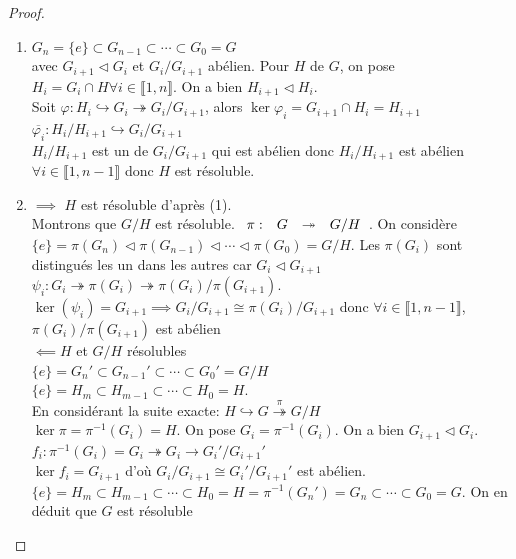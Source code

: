 \documentclass[]{report}
\begin{document}
    \begin{proof}
        \begin{enumerate}
            \item $G_n=\{e\}\subset G_{n-1}\subset \cdots\subset G_0=G$\\
            avec $G_{i+1}\triangleleft G_i$ et $G_i/G_{i+1}$ abélien. Pour $H$ \sg de $G$, on pose $H_i=G_i\cap H\forall i\in \llbracket 1,n\rrbracket$. On a bien $H_{i+1}\triangleleft H_i$.\\
            Soit $\varphi: H_i\hookrightarrow G_i\twoheadrightarrow G_i/G_{i+1}$, alors $\ker \varphi_i=G_{i+1}\cap H_i=H_{i+1}$\\
            $\overline{\varphi_i}: H_i/H_{i+1}\hookrightarrow G_i/G_{i+1}$\\
            $H_i/H_{i+1}$ est un \sg de $G_i/G_{i+1}$ qui est abélien donc $H_i/H_{i+1}$ est abélien $\forall i\in \llbracket 1,n-1\rrbracket$ donc $H$ est résoluble.
            \item $\implies$ $H$ est résoluble d'après (1).\\
            Montrons que $G/H$ est résoluble. $\begin{array}{ccccc} \pi : & G & \twoheadrightarrow & G/H \end{array}$. On considère $\{e\}=\pi(G_n)\triangleleft \pi (G_{n-1})\triangleleft\cdots\triangleleft\pi(G_0)=G/H$. Les $\pi(G_i)$ sont distingués les un dans les autres car $G_i\triangleleft G_{i+1}$\\
            $\psi_i: G_i\twoheadrightarrow \pi(G_i)\twoheadrightarrow \pi(G_i)/\pi(G_{i+1})$. $\ker(\psi_i)=G_{i+1}\implies G_i/G_{i+1}\cong\pi(G_i)/G_{i+1}$
            donc $\forall i\in\llbracket 1,n-1\rrbracket$,$\pi(G_i)/\pi(G_{i+1})$ est abélien\\
            $\impliedby H$ et $G/H$ résolubles\\
            $\{e\}=G_n'\subset G_{n-1}'\subset \cdots \subset G_0'=G/H$\\
            $\{e\}=H_m\subset H_{m-1}\subset \cdots \subset H_0=H$.\\
            En considérant la suite exacte: $H\hookrightarrow G\overset{\pi}{\twoheadrightarrow}G/H$\\
            $\ker\pi=\pi^{-1}(G_i)=H$. On pose $G_i=\pi^{-1}(G_i)$. On a bien $G_{i+1}\triangleleft G_i$. $f_i:\pi^{-1}(G_i)=G_i\twoheadrightarrow G_i\to G_i'/G_{i+1}'$\\
            $\ker f_i=G_{i+1}$ d'où $G_i/G_{i+1}\cong G_i'/G_{i+1}'$ est abélien.\\
            $\{e\}=H_m\subset H_{m-1}\subset\cdots\subset H_0=H=\pi^{-1}(G_n')=G_n\subset\cdots\subset G_0=G$. On en déduit que $G$ est résoluble
        \end{enumerate}
    \end{proof}
\end{document}
